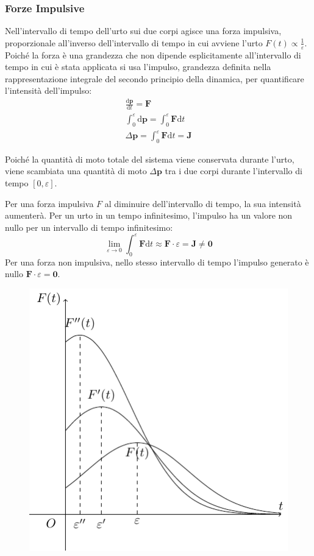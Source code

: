\documentclass{article}
\newcommand{\vect}[1]{\boldsymbol{\mathbf{#1}}}
\newcommand{\df}{\mathrm{d}}
\numberwithin{equation}{subsection}
\begin{document}
 
\subsubsection{Forze Impulsive}
Nell'intervallo di tempo dell'urto sui due corpi agisce una 
forza impulsiva, proporzionale all'inverso dell'intervallo di tempo in cui avviene l'urto 
$F(t)\propto \displaystyle\frac{1}{\varepsilon}$. 
Poiché la forza è una grandezza che non dipende esplicitamente all'intervallo di 
tempo in cui è stata applicata si usa l'impulso, grandezza definita nella rappresentazione integrale del secondo principio della dinamica, per quantificare 
l'intensità dell'impulso: 
\begin{gather*}
    \displaystyle\frac{\df\vect{p}}{\df t}=\vect{F}\\
    \displaystyle\int_{0}^{\varepsilon}\df\vect{p}=\int_{0}^{\varepsilon}\vect{F}\df t\\
    \Delta\vect{p}=\displaystyle\int_{0}^{\varepsilon}\vect{F}\df t=\vect{J}
\end{gather*}

Poiché la quantità di moto totale del sistema viene conservata 
durante l'urto, viene scambiata una quantità di moto $\Delta\vect{p}$ 
tra i due corpi durante l'intervallo di tempo $[0,\varepsilon]$. 

Per una forza impulsiva $F$ al diminuire dell'intervallo di tempo, la sua intensità aumenterà. Per un urto in un tempo infinitesimo, 
l'impulso ha un valore non nullo per un intervallo di tempo infinitesimo:
\begin{equation*}
    \lim_{\varepsilon\to 0}\displaystyle\int_{0}^{\varepsilon}\vect{F}\df t\approx\vect{F}\cdot\varepsilon=\vect{J}\neq\vect{0}
\end{equation*}
Per una forza non impulsiva, nello stesso intervallo di tempo l'impulso generato è nullo $\vect{F}\cdot\varepsilon=\vect{0}$. 

\begin{figure}[H]%
    \centering
    \includegraphics{forze-impulsive.pdf}%
\end{figure}
\end{document}
